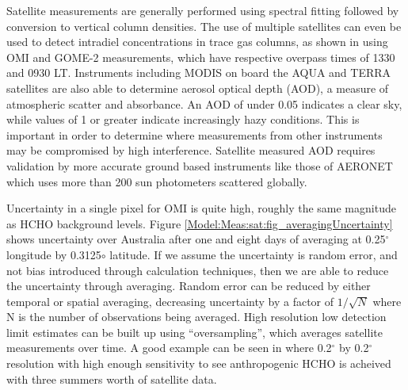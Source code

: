    Satellite measurements are generally performed using spectral fitting followed by conversion to vertical column densities.
    The use of multiple satellites can even be used to detect intradiel concentrations in trace gas columns, as shown in \textcite{Stavrakou2015} using OMI and GOME-2 measurements, which have respective overpass times of 1330 and 0930 LT.
    Instruments including MODIS on board the AQUA and TERRA satellites are also able to determine aerosol optical depth (AOD), a measure of atmospheric scatter and absorbance. 
    An AOD of under 0.05 indicates a clear sky, while values of 1 or greater indicate increasingly hazy conditions.
    This is important in order to determine where measurements from other instruments may be compromised by high interference.
    Satellite measured AOD requires validation by more accurate ground based instruments like those of AERONET which uses more than 200 sun photometers scattered globally.
    
    Uncertainty in a single pixel for OMI is quite high, roughly the same magnitude as HCHO background levels.
    Figure \ref{Model:Meas:sat:fig_averagingUncertainty} shows uncertainty over Australia after one and eight days of averaging at 0.25$^{\circ}$ longitude by 0.3125${\circ}$ latitude.
    If we assume the uncertainty is random error, and not bias introduced through calculation techniques, then we are able to reduce the uncertainty through averaging.
    Random error can be reduced by either temporal or spatial averaging, decreasing uncertainty by a factor of $1/\sqrt{N}$ where N is the number of observations being averaged.
    High resolution low detection limit estimates can be built up using ``oversampling'', which averages satellite measurements over time.
    A good example can be seen in \textcite{Zhu2014} where 0.2$^{\circ}$ by 0.2$^{\circ}$ resolution with high enough sensitivity to see anthropogenic HCHO is acheived with three summers worth of satellite data.
    
